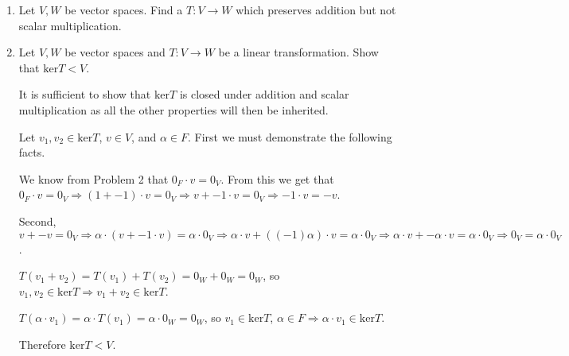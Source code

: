 \documentclass[12pt]{article}
\begin{document}
\begin{enumerate}
\item Let $V,W$ be vector spaces.  Find a $T: V \rightarrow W$ which preserves addition but not scalar multiplication.

\item Let $V,W$ be vector spaces and $T: V \rightarrow W$ be a linear transformation.  Show that $\mathrm{ker} T < V$.

It is sufficient to show that $\mathrm{ker} T$ is closed under addition and scalar multiplication as all the other properties will then be inherited.

Let $v_1,v_2 \in \mathrm{ker} T$, $v \in V$, and $\alpha \in F$.  First we must demonstrate the following facts. 

We know from Problem 2 that $0_F \cdot v = 0_V$.  From this we get that $0_F \cdot v = 0_V \Rightarrow (1 + -1) \cdot v = 0_V \Rightarrow v + -1 \cdot v = 0_V \Rightarrow -1 \cdot v = -v$.  

Second, $v + -v = 0_V \Rightarrow \alpha \cdot (v + -1 \cdot v) = \alpha \cdot 0_V \Rightarrow \alpha \cdot v + ((-1)\alpha) \cdot v = \alpha \cdot 0_V \Rightarrow \alpha \cdot v + -\alpha \cdot v = \alpha \cdot 0_V \Rightarrow 0_V = \alpha \cdot 0_V$.

$T(v_1 + v_2) = T(v_1) + T(v_2) = 0_W + 0_W = 0_W$, so $v_1,v_2 \in \mathrm{ker}T \Rightarrow v_1 + v_2 \in \mathrm{ker}T$.

$T(\alpha \cdot v_1) = \alpha \cdot T(v_1) = \alpha \cdot 0_W = 0_W$, so $v_1 \in \mathrm{ker}T$, $\alpha \in F \Rightarrow \alpha \cdot v_1 \in \mathrm{ker}T$.

Therefore $\mathrm{ker} T < V$.


\end{enumerate}
\end{document}
